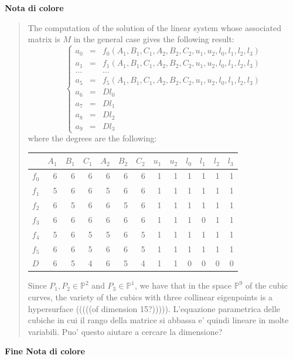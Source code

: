 \documentclass{amsart}
\theoremstyle{plain}
\theoremstyle{definition}
\begin{document}
\noindent
\textbf{Nota di colore}
\begin{quote}
The computation of the solution of the linear system whose associated
matrix is $M$ in the general case gives the following
result:
\[
\left\{
\begin{array}{rcl}
  a_0 & = & f_0(A_1, B_1, C_1, A_2, B_2, C_2, u_1, u_2, l_0, l_1, l_2, l_3) \\
  a_1 & = & f_1(A_1, B_1, C_1, A_2, B_2, C_2, u_1, u_2, l_0, l_1, l_2, l_3) \\
  \dots & & \dots \\
  a_5 & = & f_5(A_1, B_1, C_1, A_2, B_2, C_2, u_1, u_2, l_0, l_1, l_2, l_3) \\
  a_6 & = & D l_0\\
  a_7 & = & D l_1\\
  a_8 & = & D l_2\\
  a_9 &=& D l_3
\end{array}
\right.
\]
where the degrees are the following:

\begin{tabular}{|l|rrrrrrrrrrrr|} \hline
  & $A_{1}$ & $B_{1}$ & $C_{1}$ & $A_{2}$ & $B_{2}$ & $C_{2}$ &
  $u_{1}$ & $u_{2}$ & $l_0$ & $l_1$ & $l_2$ & $l_3$ \\ \hline
$f_0$& 6 & 6 & 6 & 6 & 6 & 6 & 1 & 1 & 1 & 1 & 1 & 1 \\
$f_1$& 5 & 6 & 6 & 5 & 6 & 6 & 1 & 1 & 1 & 1 & 1 & 1 \\
$f_2$& 6 & 5 & 6 & 6 & 5 & 6 & 1 & 1 & 1 & 1 & 1 & 1 \\
$f_3$& 6 & 6 & 6 & 6 & 6 & 6 & 1 & 1 & 1 & 0 & 1 & 1 \\
$f_4$& 5 & 6 & 5 & 5 & 6 & 5 & 1 & 1 & 1 & 1 & 1 & 1 \\
$f_5$& 6 & 6 & 5 & 6 & 6 & 5 & 1 & 1 & 1 & 1 & 1 & 1 \\
$D$& 6 & 5 & 4 & 6 & 5 & 4 & 1 & 1 & 0 & 0 & 0 & 0 \\ \hline
\end{tabular}

Since $P_1, P_2 \in \mathbb{P}^2$ and $P_3 \in
\mathbb{P}^1$, we have that in the space $\mathbb{P}^9$ of the cubic
curves, the variety of the cubics with three collinear eigenpoints is
a hypersurface (((((of dimension 15?))))).
L'equazione parametrica delle cubiche in cui il rango della matrice si
abbassa e' quindi lineare in molte variabili. Puo' questo aiutare a cercare
la dimensione?
\end{quote}
\textbf{Fine Nota di colore}
\end{document}
